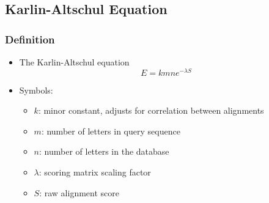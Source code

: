 \documentclass[table]{beamer}
\begin{document}
    \subsection{Karlin-Altschul Equation}
    \begin{frame}
     \frametitle{Definition}
     \begin{itemize}
       \item The Karlin-Altschul equation
       \begin{equation*}
         E = k m n e^{-\lambda S}
       \end{equation*}
       \item Symbols:
       \begin{itemize}
         \item $k$: minor constant, adjusts for correlation between alignments
         \item $m$: number of letters in query sequence
         \item $n$: number of letters in the database
         \item $\lambda$: scoring matrix scaling factor
         \item $S$: raw alignment score
       \end{itemize}
     \end{itemize}
    \end{frame} 

\end{document}
